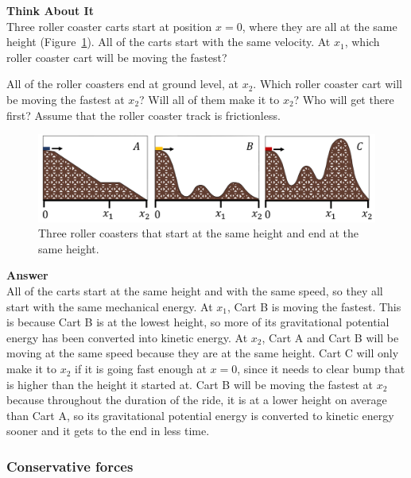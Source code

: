 \begin{framed}
\textbf{Think About It}\\
Three roller coaster carts start at position $x=0$,  where they are all at the same height (Figure~\ref{fig:potentialecons:rollercoaster}). All of the carts start with the same velocity. At $x_1$, which roller coaster cart will be moving the fastest?

All of the roller coasters end at ground level, at $x_2$. Which roller coaster cart will be moving the fastest at $x_2$? Will all of them make it to $x_2$? Who will get there first?  Assume that the roller coaster track is frictionless.

\begin{figure}[!htbp]
\centering
\includegraphics[width=0.9\linewidth]{files/rollercoaster-b808f7c2c4d1e7bad096bad327060c99.png}
\caption[]{Three roller coasters that start at the same height and end at the same height.}
\label{fig:potentialecons:rollercoaster}
\end{figure}

\begin{framed}
\textbf{Answer}\\
All of the carts start at the same height and with the same speed, so they all start with the same mechanical energy. At $x_1$, Cart B is moving the fastest. This is because Cart B is at the lowest height, so more of its gravitational potential energy has been converted into kinetic energy. At $x_2$, Cart A and Cart B will be moving at the same speed because they are at the same height. Cart C will only make it to $x_2$ if it is going fast enough at $x=0$, since it needs to clear bump that is higher than the height it started at. Cart B will be moving the fastest at $x_2$ because throughout the duration of the ride, it is at a lower height on average than Cart A, so its gravitational potential energy is converted to kinetic energy sooner and it gets to the end in less time.
\end{framed}
\end{framed}

\subsubsection{Conservative forces}\label{sec:potentialecons:conservative}

